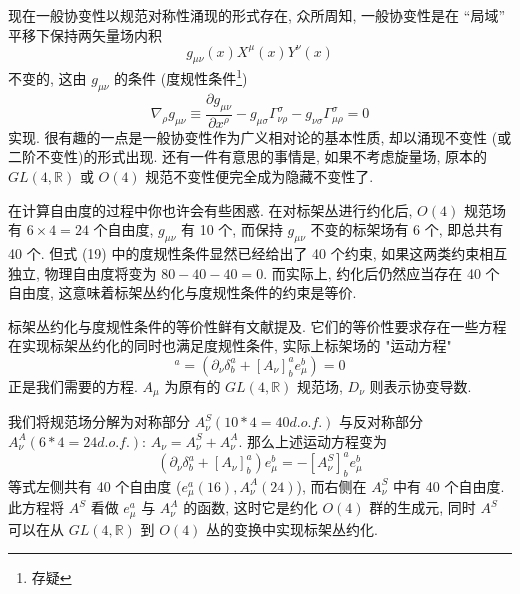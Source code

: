 \documentclass{article}
\begin{document}
 现在一般协变性以规范对称性涌现的形式存在, 众所周知, 一般协变性是在 “局域” 平移下保持两矢量场内积
 \begin{equation}
 g_{\mu\nu}(x)X^{\mu}(x)Y^{\nu}(x)
 \end{equation}不变的, 这由 $g_{\mu\nu}$ 的条件 (度规性条件\footnote{存疑})
\begin{equation}
\nabla_{\rho}g_{\mu\nu}\equiv \frac{\partial g_{\mu\nu}}{\partial x^{\rho}}-g_{\mu\sigma}\Gamma_{\nu\rho}^{\sigma}-g_{\nu\sigma}\Gamma_{\mu\rho}^{\sigma}=0
\end{equation}
实现. 很有趣的一点是一般协变性作为广义相对论的基本性质, 却以涌现不变性 (或二阶不变性)的形式出现. 还有一件有意思的事情是, 如果不考虑旋量场, 原本的 $GL(4,\mathbb{R})$ 或 $O(4)$ 规范不变性便完全成为隐藏不变性了.

在计算自由度的过程中你也许会有些困惑. 在对标架丛进行约化后, $O(4)$ 规范场有 $6\times4=24$ 个自由度, $g_{\mu\nu}$ 有 10 个, 而保持 $g_{\mu\nu}$ 不变的标架场有 6 个, 即总共有 40 个. 但式 (19) 中的度规性条件显然已经给出了 40 个约束, 如果这两类约束相互独立, 物理自由度将变为 $80-40-40=0$. 而实际上, 约化后仍然应当存在 40 个自由度, 这意味着标架丛约化与度规性条件的约束是等价.

标架丛约化与度规性条件的等价性鲜有文献提及. 它们的等价性要求存在一些方程在实现标架丛约化的同时也满足度规性条件, 实际上标架场的 "运动方程"
\begin{equation}
[D_{\nu}e_{\mu}]^{a}=(\partial_{\nu}\delta_{b}^{a}+[A_{\nu}]^{a}_{b}e_{\mu}^{b})=0
\end{equation}
正是我们需要的方程. $A_{\mu}$ 为原有的 $GL(4,\mathbb{R})$ 规范场, $D_{\nu}$ 则表示协变导数.

我们将规范场分解为对称部分 $A_{\nu}^{S}(10*4=40 d.o.f.)$ 与反对称部分 $A_{\nu}^{A}(6*4=24 d.o.f.)$: $A_{\nu}=A_{\nu}^{S}+A_{\nu}^{A}$. 那么上述运动方程变为
\begin{equation}
(\partial_{\nu}\delta_{b}^{a}+[A_{\nu}]^{a}_{b})e_{\mu}^{b}=-[A_{\nu}^{S}]_{b}^{a}e_{\mu}^{b}
\end{equation}
等式左侧共有 40 个自由度 ($e_{\mu}^{a}(16),A_{\nu}^{A}(24)$), 而右侧在 $A_{\nu}^{S}$ 中有 40 个自由度. 此方程将 $A^{S}$ 看做 $e_{\mu}^{a}$ 与 $A_{\nu}^{A}$ 的函数, 这时它是约化 $O(4)$ 群的生成元, 同时 $A^{S}$ 可以在从 $GL(4,\mathbb{R})$ 到 $O(4)$ 丛的变换中实现标架丛约化.
\end{document}
